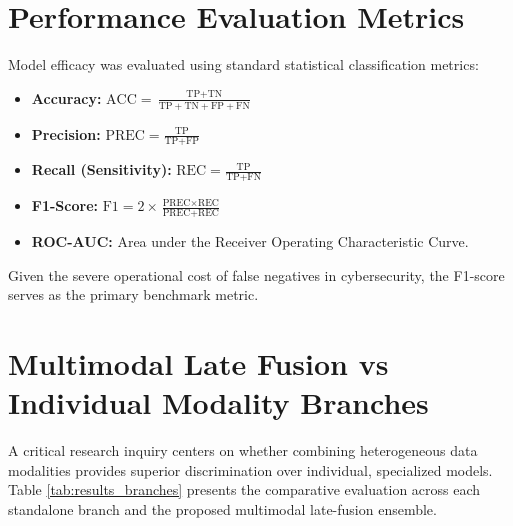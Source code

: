 \section{Performance Evaluation Metrics}
Model efficacy was evaluated using standard statistical classification metrics:
\begin{itemize}
\item \textbf{Accuracy:} $\text{ACC} = \frac{\text{TP} + \text{TN}}{\text{TP} + \text{TN} + \text{FP} + \text{FN}}$
\item \textbf{Precision:} $\text{PREC} = \frac{\text{TP}}{\text{TP} + \text{FP}}$
\item \textbf{Recall (Sensitivity):} $\text{REC} = \frac{\text{TP}}{\text{TP} + \text{FN}}$
\item \textbf{F1-Score:} $\text{F1} = 2 \times \frac{\text{PREC} \times \text{REC}}{\text{PREC} + \text{REC}}$
\item \textbf{ROC-AUC:} Area under the Receiver Operating Characteristic Curve.
\end{itemize}
Given the severe operational cost of false negatives in cybersecurity, the F1-score serves as the primary benchmark metric.

\section{Multimodal Late Fusion vs Individual Modality Branches}
A critical research inquiry centers on whether combining heterogeneous data modalities provides superior discrimination over individual, specialized models. Table \ref{tab:results_branches} presents the comparative evaluation across each standalone branch and the proposed multimodal late-fusion ensemble.


